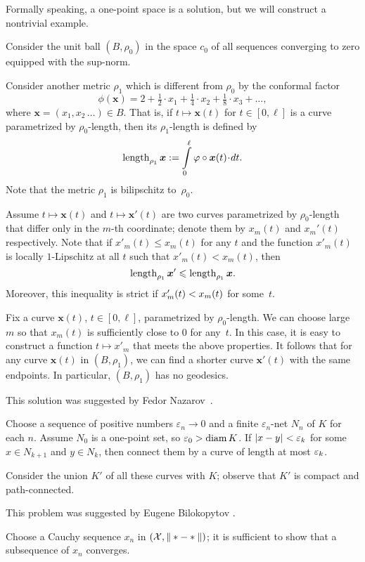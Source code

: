 Formally speaking, a one-point space is a solution,
but we will construct a nontrivial example.

Consider the unit ball $(B,\rho_0)$
in the space $c_0$ of all sequences converging to zero equipped with the sup-norm.

Consider another metric $\rho_1$ which is different from $\rho_0$ by the conformal factor
\[\phi(\bm{x})=2+\tfrac{1}2\cdot x_1+\tfrac{1}4\cdot x_2+\tfrac{1}8\cdot x_3+\dots,\]
where $\bm{x}=(x_1,x_2\,\dots)\in B$.
That is, if $t\mapsto\bm{x}(t)$ for $t\in[0,\ell]$ is a curve parametrized by $\rho_0$-length,
then its $\rho_1$-length is defined by
\[\length_{\rho_1}\bm{x}\df\int\limits_0^\ell\phi\circ\bm{x}(t)\cdot dt.\]
Note that the metric $\rho_1$ is bilipschitz to~$\rho_0$.

Assume $t\mapsto \bm{x}(t)$ and $t\mapsto \bm{x}'(t)$ are two curves parametrized by $\rho_0$-length that differ only in the $m$-th coordinate; denote them by $x_m(t)$ and $x_m'(t)$ respectively.
Note that if $x'_m(t)\le x_m(t)$ for any $t$ and 
the function $x'_m(t)$ is locally $1$-Lipschitz at all $t$ such that $x'_m(t)< x_m(t)$, then 
\[\mathop{\rm length}\nolimits_{\rho_1}\bm{x}'\leqslant \mathop{\rm length}\nolimits_{\rho_1}\bm{x}.\]
Moreover, this inequality is strict if $x'_m(t)\z< x_m(t)$ for some~$t$.

Fix a curve $\bm{x}(t)$, $t\in[0,\ell]$, parametrized by  $\rho_0$-length.
We can choose large $m$ so that $x_m(t)$ is sufficiently close to $0$ for any~$t$.
In this case, it is easy to construct a function $t\mapsto x'_m$ that meets the above properties.
It follows that for any curve $\bm{x}(t)$ in $(B,\rho_1)$, we can find a shorter curve $\bm{x}'(t)$ with the same endpoints.
In particular, $(B,\rho_1)$ has no geodesics.

This solution was suggested by Fedor Nazarov~\cite{nazarov}.

Choose a sequence of positive numbers $\varepsilon_n\to 0$ and a finite $\varepsilon_n$-net $N_n$ of $K$ for each $n$.
Assume $N_0$ is a one-point set, so $\varepsilon_0>\operatorname{\rm diam}\nolimits K$.
If $\dist{x}{y}{}<\eps_k$ for some $x\in N_{k+1}$ and $y\in N_{k}$, then connect them by a curve of length at most $\varepsilon_k$.

Consider the union $K'$ of all these curves with $K$; observe that $K'$ is compact and path-connected.

 This problem was suggested by Eugene Bilokopytov \cite{bilokopytov}.

Choose a Cauchy sequence $x_n$ in $(\spc{X},\|*\z-*\|)$; it is sufficient to show that a subsequence of $x_n$ converges.

